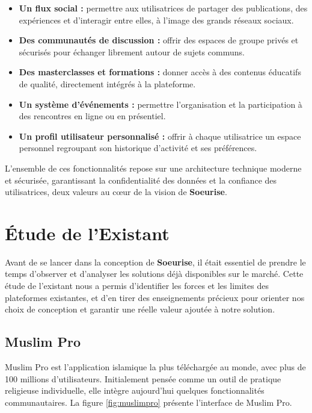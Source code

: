 \documentclass[12pt,a4paper]{report}
\begin{document}
	\begin{itemize}
		\item \textbf{Un flux social :} permettre aux utilisatrices de partager des 
		publications, des expériences et d'interagir entre elles, à l'image des 
		grands réseaux sociaux.
		
		\item \textbf{Des communautés de discussion :} offrir des espaces de groupe 
		privés et sécurisés pour échanger librement autour de sujets communs.
		
		\item \textbf{Des masterclasses et formations :} donner accès à des contenus 
		éducatifs de qualité, directement intégrés à la plateforme.
		
		\item \textbf{Un système d'événements :} permettre l'organisation et la 
		participation à des rencontres en ligne ou en présentiel.
		
		\item \textbf{Un profil utilisateur personnalisé :} offrir à chaque utilisatrice 
		un espace personnel regroupant son historique d'activité et ses préférences.
	\end{itemize}
	
	\medskip
	
	L'ensemble de ces fonctionnalités repose sur une architecture technique moderne et 
	sécurisée, garantissant la confidentialité des données et la confiance des utilisatrices, 
	deux valeurs au cœur de la vision de \textbf{Soeurise}.
	
	\section{Étude de l'Existant}
	
	Avant de se lancer dans la conception de \textbf{Soeurise}, il était essentiel de 
	prendre le temps d'observer et d'analyser les solutions déjà disponibles sur le marché. 
	Cette étude de l'existant nous a permis d'identifier les forces et les limites des 
	plateformes existantes, et d'en tirer des enseignements précieux pour orienter nos 
	choix de conception et garantir une réelle valeur ajoutée à notre solution.
	
	\subsection{Muslim Pro}
	
	Muslim Pro est l'application islamique la plus téléchargée au monde, avec plus de 
	100 millions d'utilisateurs. Initialement pensée comme un outil de pratique religieuse 
	individuelle, elle intègre aujourd'hui quelques fonctionnalités communautaires. 
	La figure \ref{fig:muslimpro} présente l'interface de Muslim Pro.
	
\end{document}
